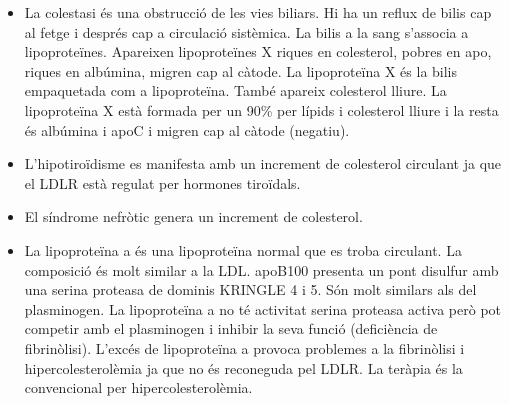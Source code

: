 \begin{itemize}
\item La colestasi és una obstrucció de les vies biliars. Hi ha un reflux de
bilis cap al fetge i després cap a circulació sistèmica. La bilis a la
sang s'associa a lipoproteïnes. Apareixen lipoproteïnes X riques en
colesterol, pobres en apo, riques en albúmina, migren cap al
càtode. La lipoproteïna X és la bilis empaquetada com a
lipoproteïna. També apareix colesterol lliure. La lipoproteïna X està
formada per un 90\% per lípids i colesterol lliure i la resta és 
albúmina i apoC i migren cap al càtode (negatiu).

\item L'hipotiroïdisme es manifesta amb un increment de colesterol circulant
ja que el LDLR està regulat per hormones tiroïdals.

\item El síndrome nefròtic genera un increment de colesterol.

\item La lipoproteïna a és una lipoproteïna normal que es troba
circulant. La composició és molt similar a la LDL. apoB100 presenta un
pont disulfur amb una serina proteasa de dominis KRINGLE 4 i 5. Són
molt similars als del plasminogen. La lipoproteïna a no té activitat
serina proteasa activa però pot competir amb el plasminogen i inhibir
la seva funció (deficiència de fibrinòlisi). L'excés de lipoproteïna a
provoca problemes a la fibrinòlisi i hipercolesterolèmia ja que no és
reconeguda pel LDLR. La teràpia és la convencional per
hipercolesterolèmia.
\end{itemize}


